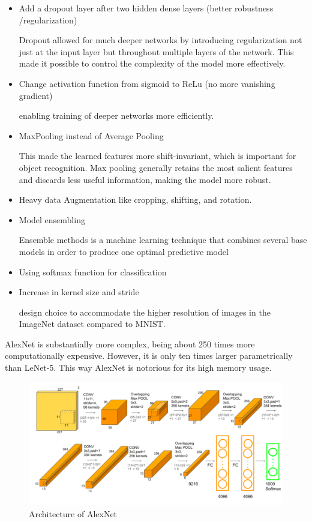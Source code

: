 \documentclass[11pt]{article}
\begin{document}
\begin{itemize}
    \item Add a dropout layer after two hidden dense layers (better robustness /regularization)
    
    Dropout allowed for much deeper networks by introducing regularization not just at the input layer but throughout multiple layers of the network. This made it possible to control the complexity of the model more effectively.

    \item Change activation function from sigmoid to ReLu (no more vanishing gradient)
    
    enabling training of deeper networks more efficiently.

    \item MaxPooling instead of Average Pooling
    
    This made the learned features more shift-invariant, which is important for object recognition. Max pooling generally retains the most salient features and discards less useful information, making the model more robust.

    \item Heavy data Augmentation like cropping, shifting, and rotation. 
    \item Model ensembling 
    
    Ensemble methods is a machine learning technique that combines several base models in order to produce one optimal predictive model

    \item Using softmax function for classification
    \item Increase in kernel size and stride
    
    design choice to accommodate the higher resolution of images in the ImageNet dataset compared to MNIST.

\end{itemize}

AlexNet is substantially more complex, being about 250 times more computationally expensive. However, it is only ten times larger parametrically than LeNet-5. This way AlexNet is notorious for its high memory usage. 

\begin{figure}[H]
    \centering
    \includegraphics[width=\linewidth]{figures/AlexNetFigure.png}
    \caption{Architecture of AlexNet}
\end{figure}
\end{document}
